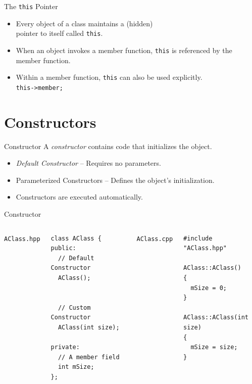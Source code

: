 \documentclass[14pt, aspectratio=1610, hyperref={pdfpagelayout=SinglePage}]{beamer}
\begin{document}
\begin{frame}[fragile]{The \texttt{this} Pointer}
  \protect\hypertarget{pointer-this}{}
  \begin{itemize}
  \item
    Every object of a class maintains a (hidden)\\ pointer to itself called
    \lstinline{this}.
  \item
    When an object invokes a member function, \lstinline{this} is referenced by the member function.
  \item
    Within a member function, \lstinline{this} can also be used explicitly.\\
    \lstinline{this->member;}
  \end{itemize}
\end{frame}
    

\section{Constructors}

\begin{frame}{Constructor}
  A \emph{constructor} contains code that initializes the object.

  \begin{itemize}
\item
  \emph{Default Constructor} -- Requires no parameters.
\item
  Parameterized Constructors -- Defines the object's initialization.
\item
  Constructors are executed automatically.
\end{itemize}
\end{frame}

\begin{frame}[fragile]{Constructor}
\begin{columns}[t]
  \texttt{AClass.hpp}
\begin{lstlisting}[basicstyle=\small\ttfamily]
class AClass {
public:
  // Default Constructor
  AClass();


  // Custom Constructor
  AClass(int size);

private:
  // A member field
  int mSize;
};
\end{lstlisting}
\texttt{AClass.cpp}
\begin{lstlisting}[basicstyle=\small\ttfamily]
#include "AClass.hpp"

AClass::AClass()
{
  mSize = 0;
}

AClass::AClass(int size)
{
  mSize = size;
}
\end{lstlisting}
\end{columns}
\end{frame}
\end{document}

